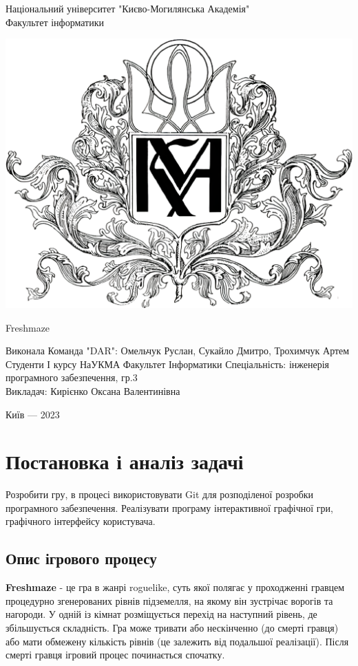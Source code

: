 \documentclass{article}
\begin{document}
\begin{titlepage}
	\begin{center} \large
		Національний університет "Києво-Могилянська Академія"\\Факультет інформатики
	\end{center}
	\vspace*{\fill}
	\begin{center}
		\includegraphics[width=0.5 \textwidth]{kma}
	\end{center}
	\vspace*{\fill}
	\begin{center} \LARGE
		Freshmaze
	\end{center}
	\vspace*{\fill}
	\textwidth
	Виконала Команда "DAR": Омельчук Руслан, Сукайло Дмитро, Трохимчук Артем Студенти І курсу НаУКМА Факультет Інформатики
	Спеціальність: інженерія програмного забезпечення, гр.3
	\\Викладач: Кирієнко Оксана Валентинівна
	\vspace*{\fill}
	\begin{center}
		Київ --- 2023
	\end{center}
\end{titlepage}
\section{Постановка і аналіз задачі}
Розробити гру, в процесі використовувати Git для розподіленої розробки
програмного забезпечення. Реалізувати програму інтерактивної графічної
гри, графічного інтерфейсу користувача.
\subsection{Опис ігрового процесу}
\textbf{Freshmaze} - це гра в жанрі roguelike, суть якої полягає у проходженні гравцем процедурно
згенерованих рівнів підземелля, на якому він зустрічає ворогів та нагороди.
У одній із кімнат розміщується перехід на наступний рівень, де збільшується складність.
Гра може тривати або нескінченно (до смерті гравця) або мати обмежену кількість рівнів
(це залежить від подальшої реалізації).
Після смерті гравця ігровий процес починається спочатку.
\end{document}
